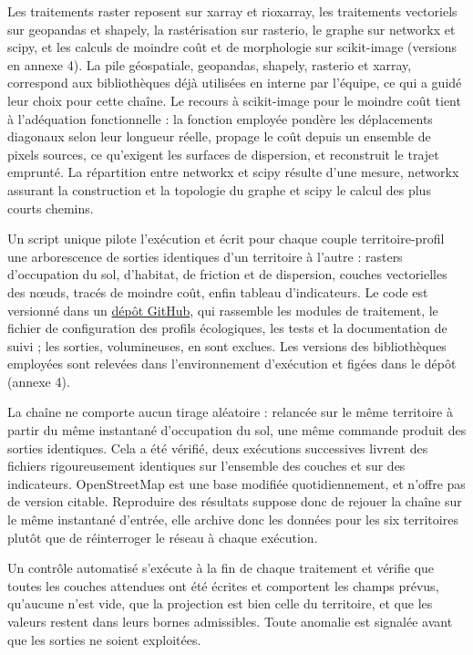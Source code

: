 \documentclass[a4paper,12pt]{report}
\begin{document}
Les traitements raster reposent sur xarray et rioxarray, les traitements vectoriels sur geopandas et shapely, la rastérisation sur rasterio, le graphe sur networkx et scipy, et les calculs de moindre coût et de morphologie sur scikit-image (versions en annexe 4). La pile géospatiale, geopandas, shapely, rasterio et xarray, correspond aux bibliothèques déjà utilisées en interne par l'équipe, ce qui a guidé leur choix pour cette chaîne. Le recours à scikit-image pour le moindre coût tient à l'adéquation fonctionnelle : la fonction employée pondère les déplacements diagonaux selon leur longueur réelle, propage le coût depuis un ensemble de pixels sources, ce qu'exigent les surfaces de dispersion, et reconstruit le trajet emprunté. La répartition entre networkx et scipy résulte d'une mesure, networkx assurant la construction et la topologie du graphe et scipy le calcul des plus courts chemins.

Un script unique pilote l'exécution et écrit pour chaque couple territoire-profil une arborescence de sorties identiques d'un territoire à l'autre : rasters d'occupation du sol, d'habitat, de friction et de dispersion, couches vectorielles des nœuds, tracés de moindre coût, enfin tableau d'indicateurs. Le code est versionné dans un \href{https://github.com/marion-billy/urbiverde_ivb}{dépôt GitHub}, qui rassemble les modules de traitement, le fichier de configuration des profils écologiques, les tests et la documentation de suivi ; les sorties, volumineuses, en sont exclues. Les versions des bibliothèques employées sont relevées dans l'environnement d'exécution et figées dans le dépôt (annexe 4).

La chaîne ne comporte aucun tirage aléatoire : relancée sur le même territoire à partir du même instantané d'occupation du sol, une même commande produit des sorties identiques. Cela a été vérifié, deux exécutions successives livrent des fichiers rigoureusement identiques sur l'ensemble des couches et sur des indicateurs. OpenStreetMap est une base modifiée quotidiennement, et n'offre pas de version citable. Reproduire des résultats suppose donc de rejouer la chaîne sur le même instantané d'entrée, elle archive donc les données pour les six territoires plutôt que de réinterroger le réseau à chaque exécution.

Un contrôle automatisé s'exécute à la fin de chaque traitement et vérifie que toutes les couches attendues ont été écrites et comportent les champs prévus, qu'aucune n'est vide, que la projection est bien celle du territoire, et que les valeurs restent dans leurs bornes admissibles. Toute anomalie est signalée avant que les sorties ne soient exploitées. 
\end{document}
